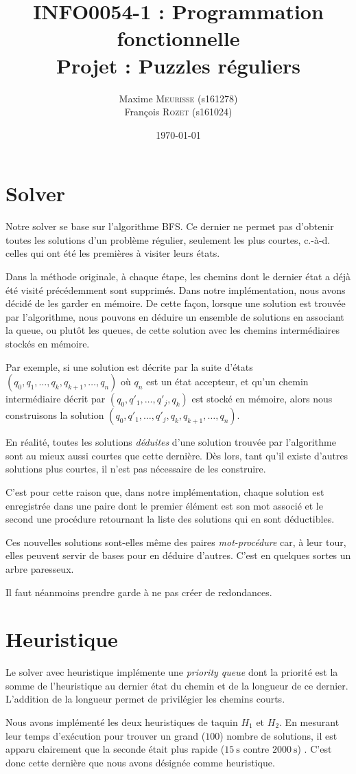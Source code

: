 \documentclass[a4paper, 11pt]{article}
\title{\textbf{\textsc{INFO0054-1} : Programmation fonctionnelle}\\Projet : Puzzles réguliers}
\author{Maxime \textsc{Meurisse} (s161278)\\François \textsc{Rozet} (s161024)\\}
\date{\today}
\begin{document}
    \maketitle
    \section{Solver}
    Notre solver se base sur l'algorithme BFS. Ce dernier ne permet pas d'obtenir toutes les solutions d'un problème régulier, seulement les plus courtes, c.-à-d. celles qui ont été les \og{}premières\fg{} à visiter leurs états. \par
    Dans la méthode originale, à chaque étape, les chemins dont le dernier état a déjà été visité précédemment sont supprimés. Dans notre implémentation, nous avons décidé de les garder en mémoire. De cette façon, lorsque une solution est trouvée par l'algorithme, nous pouvons en déduire un ensemble de solutions en associant la queue, ou plutôt les queues, de cette solution avec les chemins intermédiaires stockés en mémoire. \par
    Par exemple, si une solution est décrite par la suite d'états $(q_0, q_1, \ldots, q_k, q_{k+1}, \ldots, q_n)$ où $q_n$ est un état accepteur, et qu'un chemin intermédiaire décrit par $(q_0, q'_1, \ldots, q'_j, q_k)$ est stocké en mémoire, alors nous construisons la solution $(q_0, q'_1, \ldots, q'_j, q_k, q_{k+1}, \ldots, q_n)$. \par
    En réalité, toutes les solutions \emph{déduites} d'une solution trouvée par l'algorithme sont au mieux aussi courtes que cette dernière. Dès lors, tant qu'il existe d'autres solutions plus courtes, il n'est pas nécessaire de les construire. \par
    C'est pour cette raison que, dans notre implémentation, chaque solution est enregistrée dans une paire dont le premier élément est son mot associé et le second une procédure retournant la liste des solutions qui en sont déductibles. \par
    Ces nouvelles solutions sont-elles même des paires \emph{mot-procédure} car, à leur tour, elles peuvent servir de bases pour en déduire d'autres. C'est en quelques sortes un \og{}arbre paresseux\fg{}. \par 
    Il faut néanmoins prendre garde à ne pas créer de redondances.
    \setcounter{section}{2}
    \section{Heuristique}
    Le solver \og{}avec heuristique\fg{} implémente une \emph{priority queue} dont la priorité est la somme de l'heuristique au dernier état du chemin et de la longueur de ce dernier. L'addition de la longueur permet de privilégier les chemins courts. \par
    Nous avons implémenté les deux heuristiques de taquin $H_1$ et $H_2$. En mesurant leur temps d'exécution pour trouver un grand ($\num{100}$) nombre de solutions, il est apparu clairement que la seconde était plus rapide ($\SI{15}{\second}$ contre $\SI{2000}{\second}$) . C'est donc cette dernière que nous avons désignée comme heuristique.
\end{document}
